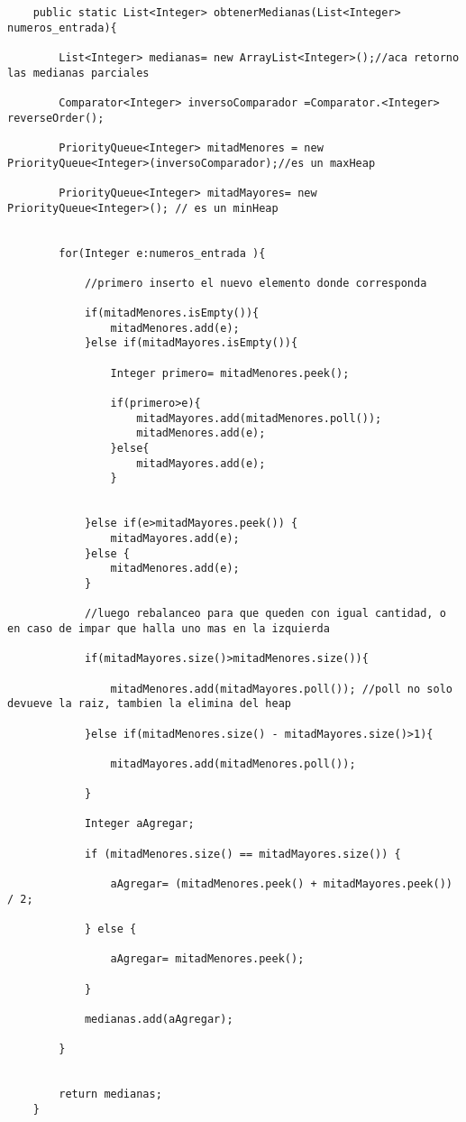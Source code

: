 \documentclass[a4paper]{article}
\begin{document}
\begin{lstlisting}
	public static List<Integer> obtenerMedianas(List<Integer> numeros_entrada){
		
		List<Integer> medianas= new ArrayList<Integer>();//aca retorno las medianas parciales
		
		Comparator<Integer> inversoComparador =Comparator.<Integer> reverseOrder();
		
		PriorityQueue<Integer> mitadMenores = new PriorityQueue<Integer>(inversoComparador);//es un maxHeap

		PriorityQueue<Integer> mitadMayores= new PriorityQueue<Integer>(); // es un minHeap
		
		
		for(Integer e:numeros_entrada ){
			
			//primero inserto el nuevo elemento donde corresponda
			
			if(mitadMenores.isEmpty()){
				mitadMenores.add(e);
			}else if(mitadMayores.isEmpty()){
						
				Integer primero= mitadMenores.peek();
				
				if(primero>e){
					mitadMayores.add(mitadMenores.poll());
					mitadMenores.add(e);
				}else{
					mitadMayores.add(e);
				}
				
				
			}else if(e>mitadMayores.peek()) {
				mitadMayores.add(e);
			}else {
				mitadMenores.add(e);
			}
			
			//luego rebalanceo para que queden con igual cantidad, o en caso de impar que halla uno mas en la izquierda
			
			if(mitadMayores.size()>mitadMenores.size()){
				
				mitadMenores.add(mitadMayores.poll()); //poll no solo devueve la raiz, tambien la elimina del heap
				
			}else if(mitadMenores.size() - mitadMayores.size()>1){
				
				mitadMayores.add(mitadMenores.poll());
				
			}
			
			Integer aAgregar;
			
			if (mitadMenores.size() == mitadMayores.size()) {
				
				aAgregar= (mitadMenores.peek() + mitadMayores.peek()) / 2;
				
			} else {
				
				aAgregar= mitadMenores.peek();
				
			}
			
			medianas.add(aAgregar);
		
		}
		
		
		return medianas;
	}
	
\end{lstlisting}





\end{document}

